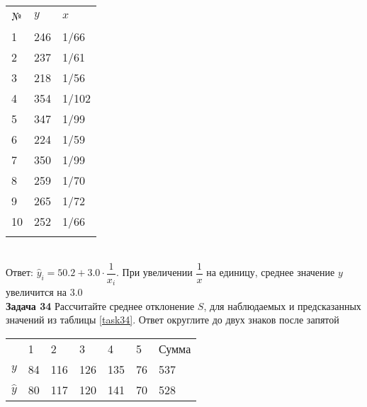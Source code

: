 \documentclass{article}
\begin{document}
\begin{minipage}{\textwidth}
\footnotesize
\centering
\begin{tabularx}{0.8\textwidth}{YYY}
\toprule
№ & $y$ & $x$ \\
\cmidrule(lr){1-1}\cmidrule(lr){2-2}\cmidrule(lr){3-3}
1 & 246 & 1/66 \\

2 & 237 & 1/61 \\

3 & 218 & 1/56 \\

4 & 354 & 1/102 \\

5 & 347 & 1/99 \\

6 & 224 & 1/59 \\

7 & 350 & 1/99 \\

8 & 259 & 1/70 \\

9 & 265 & 1/72 \\

10 & 252 & 1/66 \\
\addlinespace[0.3ex]\bottomrule
\end{tabularx}
\label{task33}
\end{minipage} \\[35pt]

Ответ: $\hat y_i = 50.2+3.0\cdot \dfrac{1}{x_i}$. При увеличении $\dfrac{1}{x}$ на единицу, среднее значение $y$ увеличится на 3.0\\

\textbf{Задача 34} Рассчитайте среднее отклонение $S$, для наблюдаемых и предсказанных значений из таблицы \ref{task34}. Ответ округлите до двух знаков после запятой\\

\begin{minipage}{\textwidth}
\centering
\begin{tabularx}{0.8\textwidth}{YYYYYYY}
\toprule
 & 1 & 2 & 3 & 4 & 5 & Сумма \\
\cmidrule(lr){1-1}\cmidrule(lr){2-6}\cmidrule(lr){7-7}
$y$ & 84 & 116 & 126 & 135 & 76 & 537 \\

$\hat y$ & 80 & 117 & 120 & 141 & 70 & 528 \\
\bottomrule
\end{tabularx}
\label{task34}
\end{minipage} \\[35pt]
\end{document}
